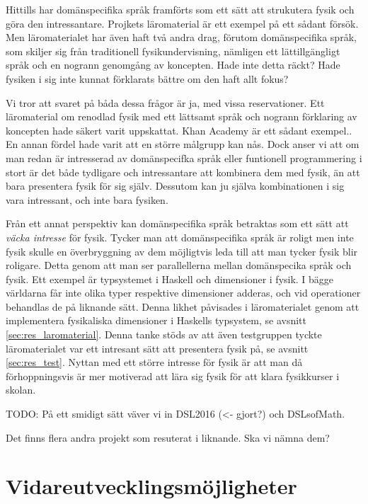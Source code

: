 \begin{draft}
Hittills har domänspecifika språk framförts som ett sätt att strukutera fysik
och göra den intressantare. Projkets läromaterial är ett exempel på ett sådant
försök. Men läromaterialet har även haft två andra drag, förutom domänspecifika
språk, som skiljer sig från traditionell fysikundervisning, nämligen ett
lättillgängligt språk och en nogrann genomgång av koncepten. Hade inte detta
räckt? Hade fysiken i sig inte kunnat förklarats bättre om den haft allt fokus?

Vi tror att svaret på båda dessa frågor är ja, med vissa reservationer. Ett
läromaterial om renodlad fysik med ett lättsamt språk och nogrann förklaring av
koncepten hade säkert varit uppskattat. Khan Academy är ett sådant
exempel.\cite{khan}. En annan fördel hade varit att en större målgrupp kan nås.
Dock anser vi att om man redan är intresserad av domänspecifka språk eller
funtionell programmering i stort är det både tydligare och intressantare att
kombinera dem med fysik, än att bara presentera fysik för sig själv. Dessutom
kan ju själva kombinationen i sig vara intressant, och inte bara fysiken.

Från ett annat perspektiv kan domänspecifika språk betraktas som ett sätt att
\textit{väcka intresse} för fysik. Tycker man att domänspecifika språk är roligt
men inte fysik skulle en överbryggning av dem möjligtvis leda till att man tycker fysik
blir roligare. Detta genom att man ser parallellerna mellan
domänspecika språk och fysik. Ett exempel är typsystemet i Haskell och
dimensioner i fysik. I bägge världarna får inte olika typer respektive
dimensioner adderas, och vid operationer behandlas de på liknande sätt. Denna
likhet påvisades i läromaterialet genom att implementera fysikaliska dimensioner
i Haskells typsystem, se avsnitt \ref{sec:res_laromaterial}. Denna tanke stöds
av att även testgruppen tyckte läromaterialet var ett intresant sätt att
presentera fysik på, se avsnitt \ref{sec:res_test}. Nyttan med ett större
intresse för fysik är att man då förhoppningsvis är mer motiverad att lära sig
fysik för att klara fysikkurser i skolan. 

\begin{binge}
TODO: På ett smidigt sätt väver vi in DSL2016 (<- gjort?) och DSLsofMath.

Det finns flera andra projekt som resuterat i liknande. Ska vi nämna dem?
\end{binge}

\section{Vidareutvecklingsmöjligheter}


\end{draft}

